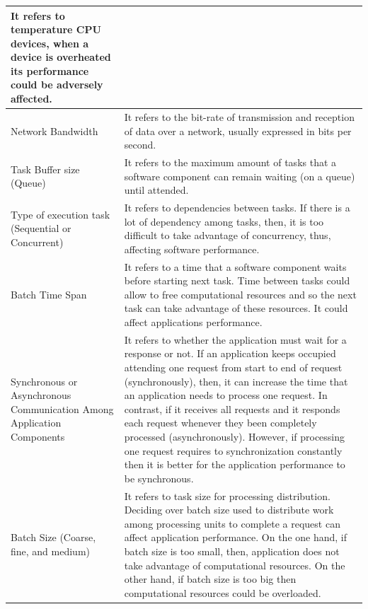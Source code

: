 {\begin{longtable}{|p{1.7in}|p{4.5in}|}
		It refers to temperature CPU devices, when a device is overheated its performance could be adversely affected.           \\ \hline
		Network Bandwidth                                   &                     
		It refers to the bit-rate of transmission and reception of data over a network, usually expressed in bits per second.            \\ \hline
		Task Buffer size (Queue)                            &                     
		It refers to the maximum amount of tasks that a software component can remain waiting (on a queue) until attended.            \\ \hline
		Type of execution task (Sequential or Concurrent)   &                     
		It refers to dependencies between tasks. If there is a lot of dependency among tasks, then, it is too difficult to take advantage of concurrency, thus, affecting software performance.           \\ \hline
		Batch Time Span                                     &                     
		It refers to a time that a software component waits before starting next task. Time between tasks could allow to free computational resources and so the next task can take advantage of these resources. It could affect  applications performance.          \\ \hline
		Synchronous or Asynchronous Communication Among Application Components          &                     
		It refers to whether the application must wait for a response or not. If an application keeps occupied attending one request from start to end of request (synchronously), then, it can increase the time that an application needs to process one request. In contrast, if it receives all requests and  it responds each request whenever they been completely processed (asynchronously). However, if processing one request requires to synchronization constantly then it is better for the application performance to be synchronous.          \\ \hline
		Batch Size (Coarse, fine, and medium)              &                     
		It refers to task size for processing distribution. Deciding over batch size used to distribute work among processing units to complete a request can affect application performance. On the one hand, if batch size is too small, then, application does not take advantage of computational resources. On the other hand, if batch size is too big then computational resources could be overloaded.           \\ \hline

\end{longtable}}
